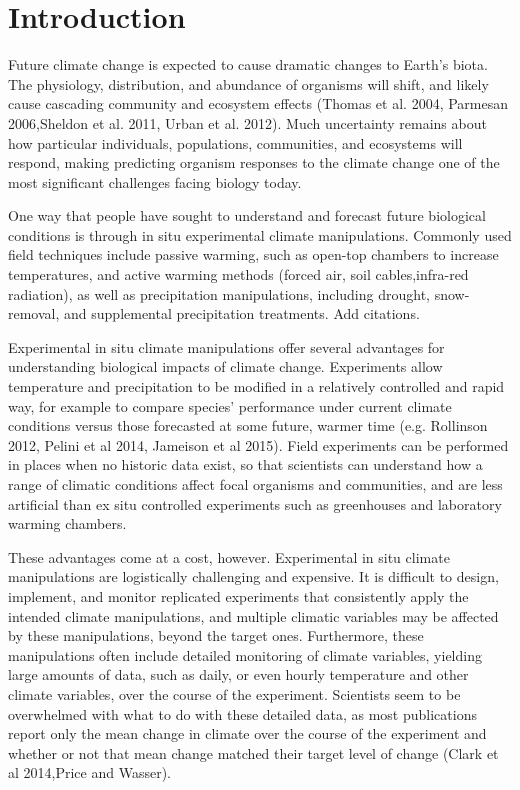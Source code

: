\documentclass{article}
\begin{document}
\section {Introduction}
\par Future climate change is expected to cause dramatic changes to Earth's biota. The physiology, distribution, and abundance of organisms will shift, and likely cause cascading community and ecosystem effects (Thomas et al. 2004, Parmesan 2006,Sheldon et al. 2011, Urban et al. 2012). Much uncertainty remains about how particular individuals, populations, communities, and ecosystems will respond, making predicting organism responses to the climate change one of the most significant challenges facing biology today.
\par One way that people have sought to understand and forecast future biological conditions is through in situ experimental climate manipulations. Commonly used field techniques include passive warming, such as open-top chambers to increase temperatures, and active warming methods (forced air, soil cables,infra-red radiation), as well as precipitation manipulations, including drought, snow-removal, and supplemental precipitation treatments. Add citations.
\par Experimental in situ climate manipulations offer several advantages for understanding biological impacts of climate change. Experiments allow temperature and precipitation to be modified in a relatively controlled and rapid way, for example to compare species' performance under current climate conditions versus those forecasted at some future, warmer time (e.g. Rollinson 2012, Pelini et al 2014, Jameison et al 2015). Field experiments can be performed in places when no historic data exist, so that scientists can understand how a range of climatic conditions affect focal organisms and communities, and are less artificial than ex situ controlled experiments such as greenhouses and laboratory warming chambers.
\par These advantages come at a cost, however. Experimental in situ climate manipulations are logistically challenging and expensive. It is difficult to design, implement, and monitor replicated experiments that consistently apply the intended climate manipulations, and multiple climatic variables may be affected by these manipulations, beyond the target ones. Furthermore, these manipulations often include detailed monitoring of climate variables, yielding large amounts of data, such as daily, or even hourly temperature and other climate variables, over the course of the experiment. Scientists seem to be overwhelmed with what to do with these detailed data, as most publications report only the mean change in climate over the course of the experiment and whether or not that mean change matched their target level of change (Clark et al 2014,Price and Wasser). 
\end{document}
